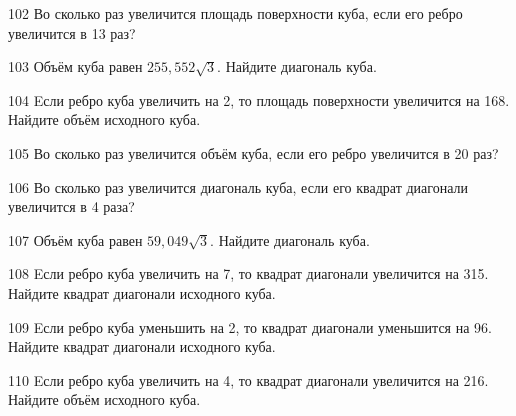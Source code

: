 \begin{taskBN}{102}
Во сколько раз увеличится площадь поверхности куба, если его ребро увеличится в 13 раз?
\end{taskBN}

\begin{taskBN}{103}
Объём куба равен $255,552\sqrt{3}$. Найдите диагональ куба.
\end{taskBN}

\begin{taskBN}{104}
Eсли ребро куба увеличить на 2, то площадь поверхности увеличится на 168. Найдите объём исходного куба.
\end{taskBN}

\begin{taskBN}{105}
Во сколько раз увеличится объём куба, если его ребро увеличится в 20 раз?
\end{taskBN}

\begin{taskBN}{106}
Во сколько раз увеличится диагональ куба, если его квадрат диагонали увеличится в 4 раза?
\end{taskBN}

\begin{taskBN}{107}
Объём куба равен $59,049\sqrt{3}$. Найдите диагональ куба.
\end{taskBN}

\begin{taskBN}{108}
Eсли ребро куба увеличить на 7, то квадрат диагонали увеличится на 315. Найдите квадрат диагонали исходного куба.
\end{taskBN}

\begin{taskBN}{109}
Eсли ребро куба уменьшить на 2, то квадрат диагонали уменьшится на 96. Найдите квадрат диагонали исходного куба.
\end{taskBN}

\begin{taskBN}{110}
Eсли ребро куба увеличить на 4, то квадрат диагонали увеличится на 216. Найдите объём исходного куба.
\end{taskBN}

